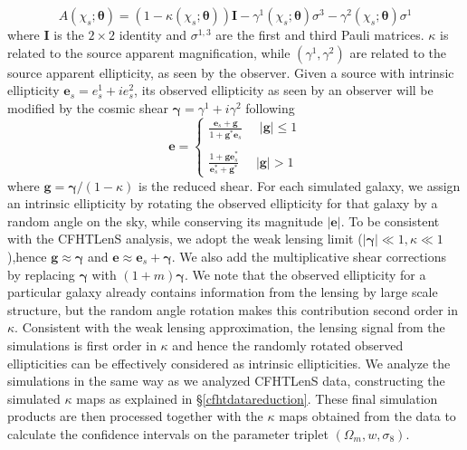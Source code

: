 \documentclass[reprint,aps,prd,superscriptaddress,showkeys,showpacs]{revtex4-1}
\begin{document}
%
%
\begin{equation}
A(\chi_s;\pmb{\theta}) = (1-\kappa(\chi_s;\pmb{\theta}))\pmb{I} - \gamma^1(\chi_s;\pmb{\theta})\sigma^3 - \gamma^2(\chi_s;\pmb{\theta})\sigma^1
\end{equation}  
%
where $\pmb{I}$ is the $2\times2$ identity and $\sigma^{1,3}$ are the first and third Pauli matrices. $\kappa$ is related to the source apparent magnification, while $(\gamma^1,\gamma^2)$ are related to the source apparent ellipticity, as seen by the observer. Given a source with intrinsic ellipticity $\mathbf{e}_s=e^1_s + ie^2_s$, its observed ellipticity as seen by an observer will be modified by the cosmic shear $\pmb{\gamma}=\gamma^1 + i\gamma^2$ following
%
\begin{equation}
\mathbf{e} = 
\begin{cases}
\frac{\mathbf{e}_s+\mathbf{g}}{1+\mathbf{g}^*\mathbf{e}_s} \,\,\,\,\,\,\,\, \vert \mathbf{g}\vert \leq 1 \\ \\
\frac{1+\mathbf{ge}_s^*}{\mathbf{e}_s^* + \mathbf{g}^*} \,\,\,\,\,\,\,\, \vert \mathbf{g}\vert > 1
\end{cases}
\end{equation}
%
where $\mathbf{g} = \pmb{\gamma}/(1-\kappa)$ is the reduced shear. For each simulated galaxy, we assign an intrinsic ellipticity by rotating the observed ellipticity for that galaxy by a random angle on the sky, while conserving its magnitude $\vert\mathbf{e}\vert$. To be consistent with the CFHTLenS analysis, we adopt the weak lensing limit ($\vert\pmb{\gamma}\vert\ll1,\kappa\ll1$),hence $\mathbf{g}\approx\pmb{\gamma}$ and $\mathbf{e}\approx \mathbf{e}_s+\pmb{\gamma}$. We also add the multiplicative shear corrections by replacing $\pmb{\gamma}$ with $(1+m)\pmb{\gamma}$. We note that the observed ellipticity for a particular galaxy already contains information from the lensing by large scale structure, but the random angle rotation makes this contribution second order in $\kappa$. Consistent with the weak lensing approximation, the lensing signal from the simulations is first order in $\kappa$ and hence the randomly rotated observed ellipticities can be effectively considered as intrinsic ellipticities. We analyze the simulations in the same way as we analyzed CFHTLenS data, constructing the simulated $\kappa$ maps as explained in \S\ref{cfhtdatareduction}. These final simulation products are then processed together with the $\kappa$ maps obtained from the data to calculate the confidence intervals on the parameter triplet $(\Omega_m,w,\sigma_8)$.
\end{document}
